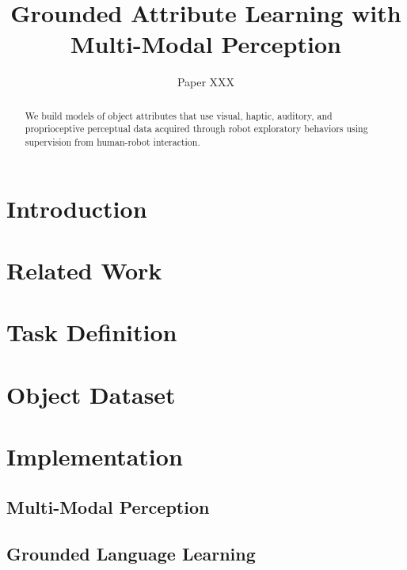 \documentclass{article}
\title{Grounded Attribute Learning with Multi-Modal Perception}
\author{Paper XXX}
\begin{document}
\maketitle

\begin{abstract}
	We build models of object attributes that use visual, haptic, auditory, and proprioceptive perceptual data acquired through robot exploratory behaviors using supervision from human-robot interaction.
\end{abstract}

\section{Introduction}
\label{sec:introduction}


\section{Related Work}
\label{sec:relatedwork}


\section{Task Definition}
\label{sec:taskdefinition}


\section{Object Dataset}
\label{sec:dataset}


\section{Implementation}
\label{sec:implementation}
	

	\subsection{Multi-Modal Perception}
	\label{ssec:mmp}


	\subsection{Grounded Language Learning}
	\label{ssec:gll}
	
\end{document}
